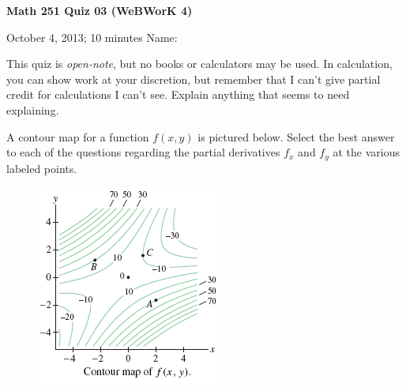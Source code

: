 \documentclass[12pt]{exam}
\begin{document}
\noindent
\textbf{{\large Math 251 \hfill Quiz 03 (WeBWorK 4)}}

\noindent
October 4, 2013; 10 minutes \hfill Name: \underline{\hspace{3in}} 

\noindent

\noindent
This quiz is \emph{open-note}, but no books or calculators may be used.
In calculation, you can show work at your discretion, but remember that
I can't give partial credit for calculations I can't see. Explain
anything that seems to need explaining.

\begin{questions} 

\question A contour map for a function $f(x,y)$ is pictured below. Select the best answer to each of the questions regarding the partial derivatives $f_x$ and $f_y$ at the various labeled points.
\begin{figure}[ht]
    \begin{minipage}[b]{0.45\linewidth}
        \includegraphics[width=\textwidth]{images/contour.png}
    \end{minipage} \hspace*{1cm}
    \begin{minipage}[b]{0.45\linewidth}
        \begin{parts}

\end{parts}
\end{minipage}
\end{figure}
\end{questions}
\end{document}
